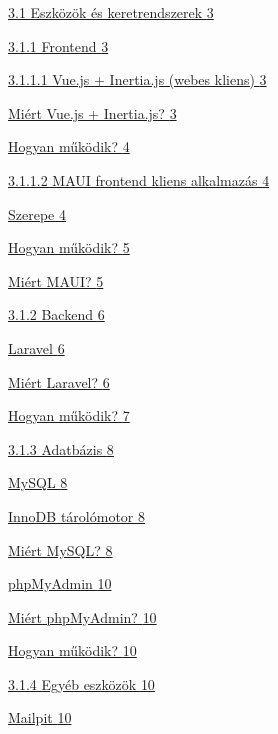 \hyperref[eszkuxf6zuxf6k-uxe9s-keretrendszerek]{3.1 Eszközök és keretrendszerek \hyperref[eszkuxf6zuxf6k-uxe9s-keretrendszerek]{3}}

\hyperref[frontend]{3.1.1 Frontend \hyperref[frontend]{3}}

\hyperref[vue.js-inertia.js-webes-kliens]{3.1.1.1 Vue.js + Inertia.js (webes kliens) \hyperref[vue.js-inertia.js-webes-kliens]{3}}

\hyperref[miuxe9rt-vue.js-inertia.js]{Miért Vue.js + Inertia.js? \hyperref[miuxe9rt-vue.js-inertia.js]{3}}

\hyperref[hogyan-mux171kuxf6dik]{Hogyan működik? \hyperref[hogyan-mux171kuxf6dik]{4}}

\hyperref[maui-frontend-kliens-alkalmazuxe1s]{3.1.1.2 MAUI frontend kliens alkalmazás \hyperref[maui-frontend-kliens-alkalmazuxe1s]{4}}

\hyperref[szerepe]{Szerepe \hyperref[szerepe]{4}}

\hyperref[hogyan-mux171kuxf6dik-1]{Hogyan működik? \hyperref[hogyan-mux171kuxf6dik-1]{5}}

\hyperref[miuxe9rt-maui]{Miért MAUI? \hyperref[miuxe9rt-maui]{5}}

\hyperref[backend]{3.1.2 Backend \hyperref[backend]{6}}

\hyperref[laravel]{Laravel \hyperref[laravel]{6}}

\hyperref[miuxe9rt-laravel]{Miért Laravel? \hyperref[miuxe9rt-laravel]{6}}

\hyperref[hogyan-mux171kuxf6dik-2]{Hogyan működik? \hyperref[hogyan-mux171kuxf6dik-2]{7}}

\hyperref[adatbuxe1zis]{3.1.3 Adatbázis \hyperref[adatbuxe1zis]{8}}

\hyperref[mysql]{MySQL \hyperref[mysql]{8}}

\hyperref[innodb-tuxe1roluxf3motor]{InnoDB tárolómotor \hyperref[innodb-tuxe1roluxf3motor]{8}}

\hyperref[miuxe9rt-mysql]{Miért MySQL? \hyperref[miuxe9rt-mysql]{8}}

\hyperref[phpmyadmin]{phpMyAdmin \hyperref[phpmyadmin]{10}}

\hyperref[miuxe9rt-phpmyadmin]{Miért phpMyAdmin? \hyperref[miuxe9rt-phpmyadmin]{10}}

\hyperref[hogyan-mux171kuxf6dik-3]{Hogyan működik? \hyperref[hogyan-mux171kuxf6dik-3]{10}}

\hyperref[egyuxe9b-eszkuxf6zuxf6k]{3.1.4 Egyéb eszközök \hyperref[egyuxe9b-eszkuxf6zuxf6k]{10}}

\hyperref[mailpit]{Mailpit \hyperref[mailpit]{10}}

